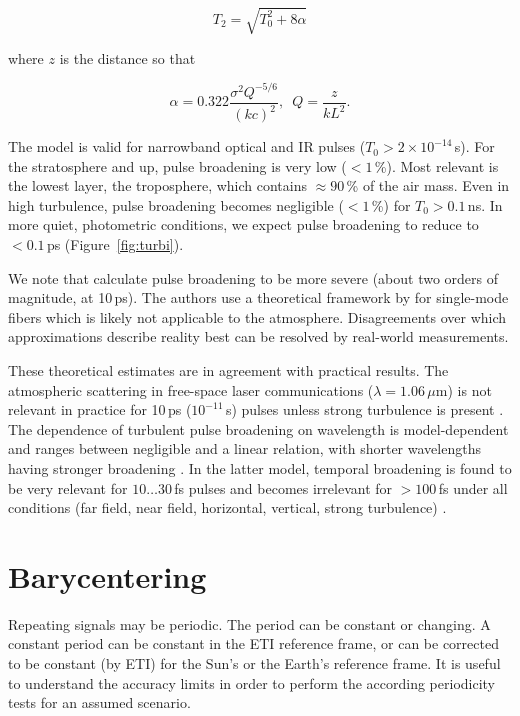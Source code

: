 \documentclass[twocolumn,tighten,longauthor]{myaastex62}
\begin{document}
\begin{equation}
T_2 = \sqrt{T^2_0 + 8 \alpha}
\end{equation}

where $z$ is the distance so that

\begin{equation}
\label{eqn:turbi}
\alpha = 0.322 \frac{\sigma^2 Q^{-5/6}}{(kc)^2},\,\,\, Q=\frac{z}{kL^2}.
\end{equation}

The model is valid for narrowband optical and IR pulses ($T_0>2 \times 10^{-14}\,$s). For the stratosphere and up, pulse broadening is very low ($<1\,$\%). Most relevant is the lowest layer, the troposphere, which contains $\approx90\,$\% of the air mass. Even in high turbulence, pulse broadening becomes negligible ($<1\,$\%) for $T_0>0.1$\,ns. In more quiet, photometric conditions, we expect pulse broadening to reduce to $<0.1\,$ps (Figure~\ref{fig:turbi}).

We note that \citet{2012OptCo.285.3169L} calculate pulse broadening to be more severe (about two orders of magnitude, at 10\,ps). The authors use a theoretical framework by \citet{Marcuse1981} for single-mode fibers which is likely not applicable to the atmosphere. Disagreements over which approximations describe reality best can be resolved by real-world measurements.

These theoretical estimates are in agreement with practical results. The atmospheric scattering in free-space laser communications ($\lambda=1.06\,\mu$m) is not relevant in practice for 10\,ps ($10^{-11}\,$s) pulses unless strong turbulence is present \citep{majumdar2010free}. The dependence of turbulent pulse broadening on wavelength is model-dependent and ranges between negligible \citet{1998ApOpt..37.7655Y} and a linear relation, with shorter wavelengths having stronger broadening \citep{Kelly1999}. In the latter model, temporal broadening is found to be very relevant for $10\dots30$\,fs pulses and becomes irrelevant for $>100\,$fs under all conditions (far field, near field, horizontal, vertical, strong turbulence) \citep{Kelly1999}.


\section{Barycentering}
\label{sec:bary}
Repeating signals may be periodic. The period can be constant or changing. A constant period can be constant in the ETI reference frame, or can be corrected to be constant (by ETI) for the Sun's or the Earth's reference frame. It is useful to understand the accuracy limits in order to perform the according periodicity tests for an assumed scenario.
\end{document}
